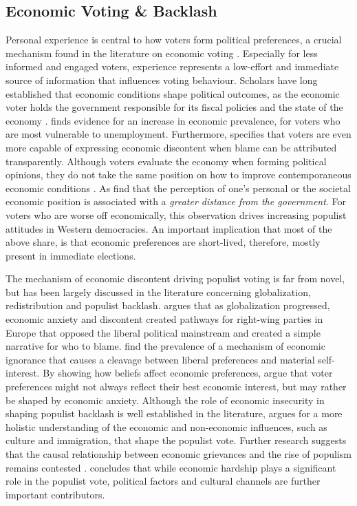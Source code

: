 \documentclass{article}
\begin{document}
\subsection{Economic Voting \& Backlash}

Personal experience is central to how voters form political preferences, a crucial mechanism found in the literature on economic voting \parencite{Duch2006}. Especially for less informed and engaged voters, experience represents a low-effort and immediate source of information that influences voting behaviour. 
Scholars have long established that economic conditions shape political outcomes, as the economic voter holds the government responsible for its fiscal policies and the state of the economy \parencite{LewisBeck2000, LEWISBECK2011288}. \textcite{Fossati2014} finds evidence for an increase in economic prevalence, for voters who are most vulnerable to unemployment. Furthermore, \textcite{Anderson2000} specifies that voters are even more capable of expressing economic discontent when blame can be attributed transparently. 
Although voters evaluate the economy when forming political opinions, they do not take the same position on how to improve contemporaneous economic conditions \parencite{LEWISBECK2011288}. As \textcite{Habersack2024} find that the perception of one's personal or the societal economic position is associated with a \textit{greater distance from the government}. For voters who are worse off economically, this observation drives increasing populist attitudes in Western democracies.
An important implication that most of the above share, is that economic preferences are short-lived, therefore, mostly present in immediate elections. 

The mechanism of economic discontent driving populist voting is far from novel, but has been largely discussed in the literature concerning globalization, redistribution and populist backlash.
\textcite{rodrik2018} argues that as globalization progressed, economic anxiety and discontent created pathways for right-wing parties in Europe that opposed the liberal political mainstream and created a simple narrative for who to blame. \textcite{Rho2017}
find the prevalence of a mechanism of economic ignorance that causes a cleavage between liberal preferences and material self-interest. By showing how beliefs affect economic preferences, \textcite{Rho2017} argue that voter preferences might not always reflect their best economic interest, but may rather be shaped by economic anxiety. Although the role of economic insecurity in shaping populist backlash is well established in the literature, \textcite{Margalit2019} argues for a more holistic understanding of the economic and non-economic influences, such as culture and immigration, that shape the populist vote. Further research suggests that the causal relationship between economic grievances and the rise of populism remains contested \parencite{Mudde2018}. \textcite{Habersack2024} concludes that while economic hardship plays a significant role in the populist vote, political factors and cultural channels are further important contributors. 
\end{document}

